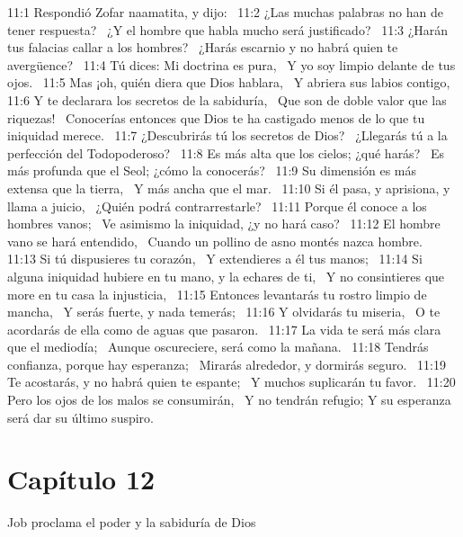 11:1 Respondió Zofar naamatita, y dijo:  
11:2 ¿Las muchas palabras no han de tener respuesta?  
¿Y el hombre que habla mucho será justificado?  
11:3 ¿Harán tus falacias callar a los hombres?  
¿Harás escarnio y no habrá quien te avergüence?  
11:4 Tú dices: Mi doctrina es pura,  
Y yo soy limpio delante de tus ojos.  
11:5 Mas ¡oh, quién diera que Dios hablara,  
Y abriera sus labios contigo,  
11:6 Y te declarara los secretos de la sabiduría,  
Que son de doble valor que las riquezas!  
Conocerías entonces que Dios te ha castigado menos de lo que tu iniquidad merece.  
11:7 ¿Descubrirás tú los secretos de Dios?  
¿Llegarás tú a la perfección del Todopoderoso?  
11:8 Es más alta que los cielos; ¿qué harás?  
Es más profunda que el Seol; ¿cómo la conocerás?  
11:9 Su dimensión es más extensa que la tierra,  
Y más ancha que el mar.  
11:10 Si él pasa, y aprisiona, y llama a juicio,  
¿Quién podrá contrarrestarle?  
11:11 Porque él conoce a los hombres vanos;  
Ve asimismo la iniquidad, ¿y no hará caso?  
11:12 El hombre vano se hará entendido,  
Cuando un pollino de asno montés nazca hombre.  
11:13 Si tú dispusieres tu corazón,  
Y extendieres a él tus manos;  
11:14 Si alguna iniquidad hubiere en tu mano, y la echares de ti,  
Y no consintieres que more en tu casa la injusticia,  
11:15 Entonces levantarás tu rostro limpio de mancha,  
Y serás fuerte, y nada temerás;  
11:16 Y olvidarás tu miseria,  
O te acordarás de ella como de aguas que pasaron.  
11:17 La vida te será más clara que el mediodía;  
Aunque oscureciere, será como la mañana.  
11:18 Tendrás confianza, porque hay esperanza;  
Mirarás alrededor, y dormirás seguro.  
11:19 Te acostarás, y no habrá quien te espante;  
Y muchos suplicarán tu favor.  
11:20 Pero los ojos de los malos se consumirán,  
Y no tendrán refugio; 
Y su esperanza será dar su último suspiro.  
\section*{Capítulo 12}
Job proclama el poder y la sabiduría de Dios  

